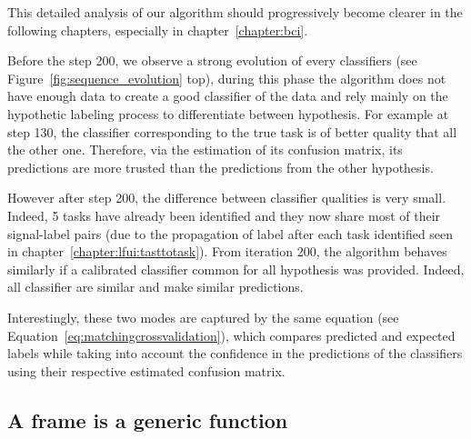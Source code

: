 This detailed analysis of our algorithm should progressively become clearer in the following chapters, especially in chapter~\ref{chapter:bci}.


Before the step 200, we observe a strong evolution of every classifiers (see Figure~\ref{fig:sequence_evolution} top), during this phase the algorithm does not have enough data to create a good classifier of the data and rely mainly on the hypothetic labeling process to differentiate between hypothesis. For example at step 130, the classifier corresponding to the true task is of better quality that all the other one. Therefore, via the estimation of its confusion matrix, its predictions are more trusted than the predictions from the other hypothesis.

However after step 200, the difference between classifier qualities is very small. Indeed, 5 tasks have already been identified and they now share most of their signal-label pairs (due to the propagation of label after each task identified seen in chapter~\ref{chapter:lfui:tasttotask}). From iteration 200, the algorithm behaves similarly if a calibrated classifier common for all hypothesis was provided. Indeed,  all classifier are similar and make similar predictions. 

Interestingly, these two modes are captured by the same equation (see Equation~\ref{eq:matchingcrossvalidation}), which compares predicted and expected labels while taking into account the confidence in the predictions of the classifiers using their respective estimated confusion matrix.



\subsection{A frame is a generic function}
\label{chapter:limitations:framegeneric}



